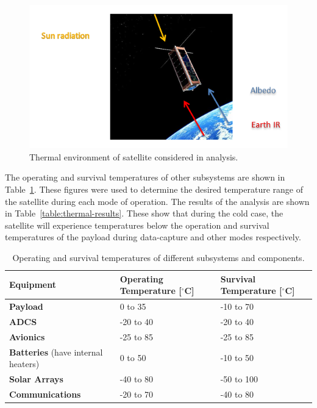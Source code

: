 \documentclass[12pt]{article}
\begin{document}
\begin{figure}[ht]%
\centering
\includegraphics{images/thermal-environment}%
\caption{Thermal environment of satellite considered in analysis.\cite{satnews}}%
\label{fig:thermal-environment}%
\end{figure}

The operating and survival temperatures of other subsystems are shown in Table~\ref{table:thermal-inputs}. These figures were used to determine the desired temperature range of the satellite during each mode of operation. The results of the analysis are shown in Table~\ref{table:thermal-results}. These show that during the cold case, the satellite will experience temperatures below the operation and survival temperatures of the payload during data-capture and other modes respectively.

\begin{table}[ht]%
\caption{Operating and survival temperatures of different subsystems and components.}
\label{table:thermal-inputs}
\begin{tabular}{|p{1.5in}|l|l|}\hline
\textbf{Equipment} & \textbf{Operating Temperature} [$^\circ$C] & \textbf{Survival Temperature} [$^\circ$C] \\\hline
\textbf{Payload} & 0 to 35 & -10 to 70 \\\hline
\textbf{ADCS} & -20 to 40 & -20 to 40 \\\hline
\textbf{Avionics} & -25 to 85 & -25 to 85\\\hline
\textbf{Batteries} (have internal heaters) & 0 to 50 & -10 to 50\\\hline
\textbf{Solar Arrays} & -40 to 80  & -50 to 100 \\\hline
\textbf{Communications} & -20 to 70 & -40 to 80 \\\hline
\end{tabular}
\end{table}
\end{document}
